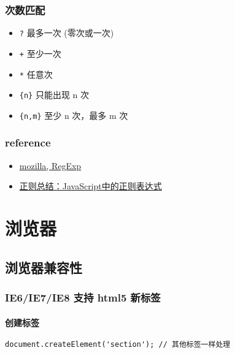 \subsubsection{次数匹配}\label{ux6b21ux6570ux5339ux914d}

\begin{itemize}
\tightlist
\item
  \lstinline!?! 最多一次 (零次或一次)
\item
  \lstinline!+! 至少一次
\item
  \lstinline!*! 任意次
\item
  \lstinline!{n}! 只能出现 n 次
\item
  \lstinline!{n,m}! 至少 n 次，最多 m 次
\end{itemize}

\subsubsection{reference}\label{reference}

\begin{itemize}
\tightlist
\item
  \href{https://developer.mozilla.org/zh-CN/docs/Web/JavaScript/Reference/Global_Objects/RegExp}{mozilla,
  RegExp}
\item
  \href{http://www.nowamagic.net/librarys/veda/detail/1283}{正则总结：JavaScript中的正则表达式}
\end{itemize}

\section{浏览器}\label{ux6d4fux89c8ux5668}

\subsection{浏览器兼容性}\label{ux6d4fux89c8ux5668ux517cux5bb9ux6027}

\subsubsection{IE6/IE7/IE8 支持 html5
新标签}\label{ie6ie7ie8-ux652fux6301-html5-ux65b0ux6807ux7b7e}

\paragraph{创建标签}\label{ux521bux5efaux6807ux7b7e}

\begin{lstlisting}[language=HTML]
document.createElement('section'); // 其他标签一样处理
\end{lstlisting}

